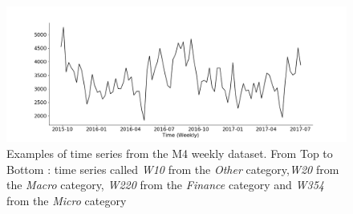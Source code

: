 \documentclass[lettersize,journal]{IEEEtran}
\begin{document}
\begin{figure}
  \includegraphics[width=1.\linewidth]{figure/W354}
\caption{Examples of time series from the M4 weekly dataset. From Top to Bottom : time series called \textit{W10} from the \textit{Other} category,\textit{W20} from the \textit{Macro} category, \textit{W220} from the \textit{Finance} category and \textit{W354} from the \textit{Micro} category}
\label{fig:m4examples}
\end{figure}
\end{document}
